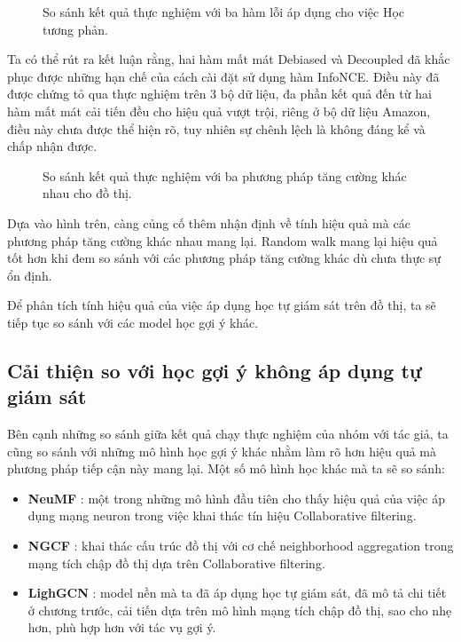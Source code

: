 \begin{figure}[H]
    \centering
    \hspace*{-13mm}
    
    \caption{So sánh kết quả thực nghiệm với ba hàm lỗi áp dụng cho việc Học tương phản.}
\end{figure}

Ta có thể rút ra kết luận rằng, hai hàm mất mát Debiased và Decoupled đã khắc phục được những hạn chế của cách cài đặt sử dụng hàm InfoNCE. Điều này đã được chứng tỏ qua thực nghiệm trên 3 bộ dữ liệu, đa phần kết quả đến từ hai hàm mất mát cải tiến đều cho hiệu quả vượt trội, riêng ở bộ dữ liệu Amazon, điều này chưa được thể hiện rõ, tuy nhiên sự chênh lệch là không đáng kể và chấp nhận được.

\begin{figure}[H]
    \centering
    \hspace*{-13mm}
    
    \caption{So sánh kết quả thực nghiệm với ba phương pháp tăng cường khác nhau cho đồ thị.}
\end{figure}

Dựa vào hình trên, càng củng cố thêm nhận định về tính hiệu quả mà các phương pháp tăng cường khác nhau mang lại. Random walk mang lại hiệu quả tốt hơn khi đem so sánh với các phương pháp tăng cường khác dù chưa thực sự ổn định.

Để phân tích tính hiệu quả của việc áp dụng học tự giám sát trên đồ thị, ta sẽ tiếp tục so sánh với các model học gợi ý khác.

\subsection{Cải thiện so với học gợi ý không áp dụng tự giám sát}

\noindent Bên cạnh những so sánh giữa kết quả chạy thực nghiệm của nhóm với tác giả, ta cũng so sánh với những mô hình học gợi ý khác nhằm làm rõ hơn hiệu quả mà phương pháp tiếp cận này mang lại. Một số mô hình học khác mà ta sẽ so sánh:

\begin{itemize}
    \item[] \textbf{NeuMF} \cite{NeuMF}: một trong những mô hình đầu tiên cho thấy hiệu quả của việc áp dụng mạng neuron trong việc khai thác tín hiệu Collaborative filtering.
    
    \item[] \textbf{NGCF} \cite{NGCF}: khai thác cấu trúc đồ thị với cơ chế neighborhood aggregation trong mạng tích chập đồ thị dựa trên Collaborative filtering.
    
    \item[] \textbf{LighGCN} \cite{LightGCN}: model nền mà ta đã áp dụng học tự giám sát, đã mô tả chi tiết ở chương trước, cải tiến dựa trên mô hình mạng tích chập đồ thị, sao cho nhẹ hơn, phù hợp hơn với tác vụ gợi ý.
\end{itemize}

